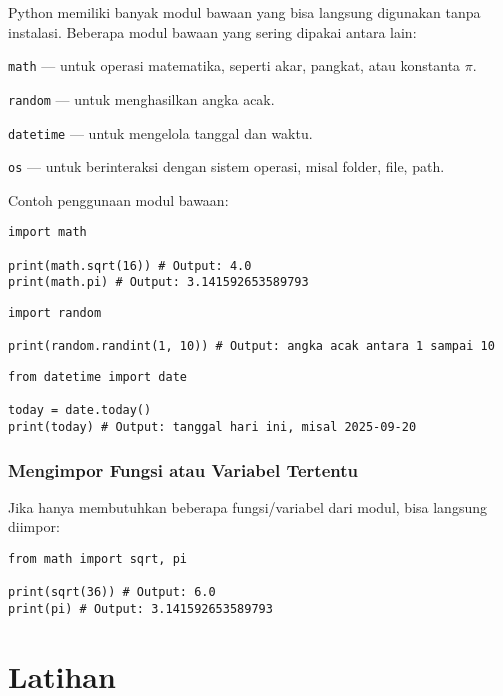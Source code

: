 Python memiliki banyak modul bawaan yang bisa langsung digunakan tanpa instalasi. Beberapa modul bawaan yang sering dipakai antara lain:

\texttt{math} — untuk operasi matematika, seperti akar, pangkat, atau konstanta \(\pi\).

\texttt{random} — untuk menghasilkan angka acak.

\texttt{datetime} — untuk mengelola tanggal dan waktu.

\texttt{os} — untuk berinteraksi dengan sistem operasi, misal folder, file, path.

Contoh penggunaan modul bawaan:

\begin{lstlisting}[style=PythonStyle, caption={Kode Python: math_module.py}]
import math

print(math.sqrt(16)) # Output: 4.0
print(math.pi) # Output: 3.141592653589793
\end{lstlisting}

\begin{lstlisting}[style=PythonStyle, caption={Kode Python: random_module.py}]
import random

print(random.randint(1, 10)) # Output: angka acak antara 1 sampai 10
\end{lstlisting}

\begin{lstlisting}[style=PythonStyle, caption={Kode Python: datetime_module.py}]
from datetime import date

today = date.today()
print(today) # Output: tanggal hari ini, misal 2025-09-20
\end{lstlisting}

\subsubsection{Mengimpor Fungsi atau Variabel Tertentu}

Jika hanya membutuhkan beberapa fungsi/variabel dari modul, bisa langsung diimpor:

\begin{lstlisting}[style=PythonStyle]
from math import sqrt, pi

print(sqrt(36)) # Output: 6.0
print(pi) # Output: 3.141592653589793
\end{lstlisting}

\section{Latihan}

